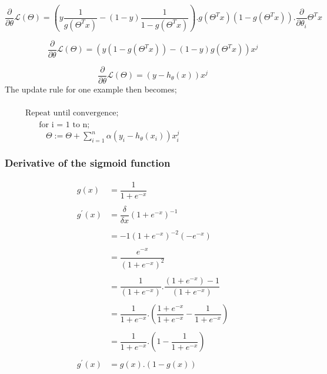 \documentclass[12pt,a4paper,titlepage,portrait,openany]{book}
\begin{document}
	$$\dfrac{\partial}{\partial\theta}\mathcal{L}(\Theta) = \left(y\dfrac{1}{g(\Theta^Tx)} - (1-y)\dfrac{1}{1-g(\Theta^Tx)}\right).g\left(\Theta^Tx\right)\left(1-g(\Theta^Tx)\right).\dfrac{\partial}{\partial\theta_i}\Theta^Tx$$
	
	$$\dfrac{\partial}{\partial\theta}\mathcal{L}(\Theta) = \left(y(1-g(\Theta^Tx)) - (1-y)g(\Theta^Tx)\right)x^j$$
	
	$$\dfrac{\partial}{\partial\theta}\mathcal{L}(\Theta) = (y-h_\theta(x))x^j$$
	The update rule for one example then becomes; \\\\
	${}\hspace{30pt} \text{Repeat until convergence;} $\\
	${}\hspace{50pt} \text{for i = 1 to n;} $\\
	${}\hspace{60pt} \Theta := \Theta + \sum_{i=1}^{n}\alpha (y_i - h_\theta(x_i))x_i^j$\\
	
	\subsubsection{Derivative of the sigmoid function}
	
	\begin{equation*}
	\begin{array}{cl}
		g(x) &= \dfrac{1}{1+e^{-x}} \\\\
		g^{'}(x) &= \dfrac{\delta}{\delta{x}} \left(1 + e^{-x}\right)^{-1} \\\\
		&= -1(1+e^{-x})^{-2}(-e^{-x}) \\\\
		&= \dfrac{e^{-x}}{\left(1+e^{-x}\right)^2} \\\\
		&= \dfrac{1}{\left(1+e^{-x}\right)}.\dfrac{(1+e^{-x})-1}{\left(1+e^{-x}\right)} \\\\
		&= \dfrac{1}{1+e^{-x}}.\left(\dfrac{1+e^{-x}}{1+e^{-x}} - \dfrac{1}{1+e^{-x}}\right) \\
		\\
		&= \dfrac{1}{1+e^{-x}}.\left(1 - \dfrac{1}{1+e^{-x}}\right) \\\\
		g^{'}(x) &= g(x).(1-g(x))
	\end{array}
	\end{equation*}
	
\end{document}
